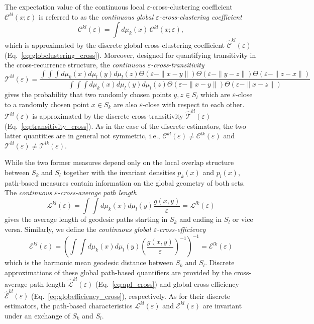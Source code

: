 The expectation value of the continuous local $\varepsilon$-cross-clustering coefficient $\mathcal{C}^{kl}(x;\varepsilon)$ is referred to as the \textit{continuous global $\varepsilon$-cross-clustering coefficient}
\begin{equation}
\mathcal{C}^{kl}(\varepsilon) = \int d\mu_k(x)\, \mathcal{C}^{kl}(x;\varepsilon),
\end{equation}
which is approximated by the discrete global cross-clustering coefficient $\hat{\mathcal{C}}^{kl}(\varepsilon)$ (Eq.~\ref{eq:globclustering_cross}). Moreover, designed for quantifying transitivity in the cross-recurrence struc\-ture, the \textit{continuous $\varepsilon$-cross-transitivity} 
\begin{equation}
\mathcal{T}^{kl}(\varepsilon) = \frac{\int\!\!\!\int\!\!\!\int d\mu_k(x) d\mu_l(y) d\mu_l(z) \Theta(\varepsilon-\|x - y\|) \Theta(\varepsilon-\|y - z\|) \Theta(\varepsilon-\|z - x\|)}{\int\!\!\!\int\!\!\!\int d\mu_k(x) d\mu_l(y) d\mu_l(z) \Theta(\varepsilon-\|x - y\|) \Theta(\varepsilon-\|x - z\|)}
\end{equation}
gives the probability that two randomly chosen points $y,z\in S_l$ which are $\varepsilon$-close to a randomly chosen point $x\in S_k$ are also $\varepsilon$-close with respect to each other. $\mathcal{T}^{kl}(\varepsilon)$ is approximated by the discrete cross-transitivity $\hat{\mathcal{T}}^{kl}(\varepsilon)$ (Eq.~\ref{eq:transitivity_cross}). As in the case of the discrete estimators, the two latter quantities are in general not symmetric, i.e., $\mathcal{C}^{kl}(\varepsilon) \neq \mathcal{C}^{lk}(\varepsilon)$ and $\mathcal{T}^{kl}(\varepsilon) \neq \mathcal{T}^{lk}(\varepsilon)$.

While the two former measures depend only on the local overlap structure between $S_k$ and $S_l$ together with the invariant densities $p_k(x)$ and $p_l(x)$, path-based measures contain information on the global geometry of both sets. The \textit{continuous $\varepsilon$-cross-average path length}
\begin{equation}
\mathcal{L}^{kl}(\varepsilon) = \int\!\!\!\int d\mu_k(x) d\mu_l(y) \frac{g(x,y)}{\varepsilon} = \mathcal{L}^{lk}(\varepsilon)
\end{equation}
gives the average length of geodesic paths starting in $S_k$ and ending in $S_l$ or vice versa. Similarly, we define the \textit{continuous global $\varepsilon$-cross-efficiency} 
\begin{equation}
\mathcal{E}^{kl}(\varepsilon) = \left( \int\!\!\!\int d\mu_k(x) d\mu_l(y) \left( \frac{g(x,y)}{\varepsilon} \right)^{-1} \right)^{-1} = \mathcal{E}^{lk}(\varepsilon)
\end{equation}
which is the harmonic mean geodesic distance between $S_k$ and $S_l$. Discrete approximations of these global path-based quantifiers are provided by the cross-average path length $\hat{\mathcal{L}}^{kl}(\varepsilon)$ (Eq.~\ref{eq:apl_cross}) and global cross-efficiency $\hat{\mathcal{E}}^{kl}(\varepsilon)$ (Eq.~\ref{eq:globefficiency_cross}), respectively. As for their discrete estimators, the path-based characteristics $\mathcal{L}^{kl}(\varepsilon)$ and $\mathcal{E}^{kl}(\varepsilon)$ are invariant under an exchange of $S_k$ and $S_l$.


